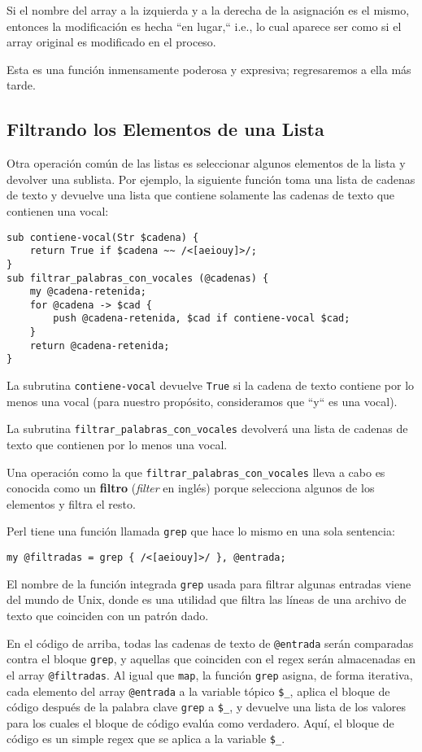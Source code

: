 Si el nombre del array a la izquierda y a la derecha de la 
asignación es el mismo, entonces la modificación es hecha
``en lugar,`` i.e., lo cual aparece ser como si el array original
es modificado en el proceso.

Esta es una función inmensamente poderosa y expresiva; regresaremos
a ella más tarde.

\subsection{Filtrando los Elementos de una Lista}

Otra operación común de las listas es seleccionar algunos elementos
de la lista y devolver una sublista. Por ejemplo, la siguiente
función toma una lista de cadenas de texto y devuelve una lista
que contiene solamente las cadenas de texto que contienen
una vocal:

\begin{verbatim}
sub contiene-vocal(Str $cadena) {
    return True if $cadena ~~ /<[aeiouy]>/;
}
sub filtrar_palabras_con_vocales (@cadenas) {
    my @cadena-retenida;
    for @cadena -> $cad { 
        push @cadena-retenida, $cad if contiene-vocal $cad;
    }
    return @cadena-retenida;
}  
\end{verbatim}
%

La subrutina {\tt contiene-vocal} devuelve {\tt True} si 
la cadena de texto contiene por lo menos una vocal (para 
nuestro propósito, consideramos que ``y`` es una vocal).

La subrutina \verb|filtrar_palabras_con_vocales| devolverá 
una lista de cadenas de texto que contienen por lo menos
una vocal.

Una operación como la que \verb|filtrar_palabras_con_vocales| lleva
a cabo es conocida como un {\bf filtro} (\emph{filter} en inglés) 
porque selecciona algunos de los elementos y filtra el resto.

Perl tiene una función llamada {\tt grep} que hace lo mismo
en una sola sentencia:

\begin{verbatim}
my @filtradas = grep { /<[aeiouy]>/ }, @entrada;
\end{verbatim}
%

El nombre de la función integrada {\tt grep} usada
para filtrar algunas entradas viene del mundo de Unix,
donde es una utilidad que filtra las líneas de una archivo
de texto que coinciden con un patrón dado. 

En el código de arriba, todas las cadenas de texto de 
\verb|@entrada| serán comparadas contra el bloque {\tt grep},
y aquellas que coinciden con el regex serán almacenadas
en el array \verb|@filtradas|. Al igual que {\tt map},
la función {\tt grep} asigna, de forma iterativa, cada elemento
del array \verb|@entrada| a la variable tópico \verb|$_|, aplica 
el bloque de código después de la palabra clave {\tt grep} a \verb|$_|, 
y devuelve una lista de los valores para los cuales el bloque
de código evalúa como verdadero. Aquí, el bloque de código es un 
simple regex que se aplica a la variable \verb|$_|.

